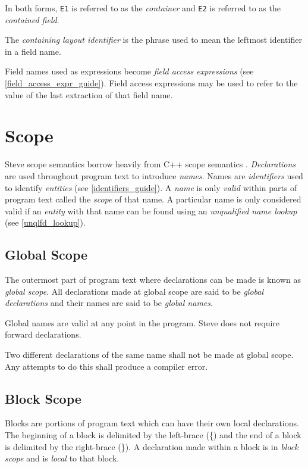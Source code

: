 In both forms, \texttt{E1} is referred to as the \textit{container} and \texttt{E2} is referred to as the \textit{contained field}.

The \textit{containing layout identifier} is the phrase used to mean the leftmost identifier in a field name.

Field names used as expressions become \textit{field access expressions} (see \ref{field_access_expr_guide}). Field access expressions may be used to refer to the value of the last extraction of that field name.

\section{Scope} \label{scope_guide}

Steve scope semantics borrow heavily from C++ scope semantics \cite{cpp_std}. \textit{Declarations} are used throughout program text to introduce \textit{names}. Names are \textit{identifiers} used to identify \textit{entities} (see \ref{identifiers_guide}). A \textit{name} is only \textit{valid} within parts of program text called the \textit{scope} of that name. A particular name is only considered valid if an \textit{entity} with that name can be found using an \textit{unqualified name lookup} (see \ref{unqlfd_lookup}).

\subsection{Global Scope} \label{global_scope}

The outermost part of program text where declarations can be made is known as \textit{global scope}. All declarations made at global scope are said to be \textit{global declarations} and their names are said to be \textit{global names}.

Global names are valid at any point in the program. Steve does not require forward declarations.

Two different declarations of the same name shall not be made at global scope. Any attempts to do this shall produce a compiler error.

\subsection{Block Scope} \label{block_scope}

Blocks are portions of program text which can have their own local declarations. The beginning of a block is delimited by the left-brace (\{) and the end of a block is delimited by the right-brace (\}). A declaration made within a block is in \textit{block scope} and is \textit{local} to that block.

